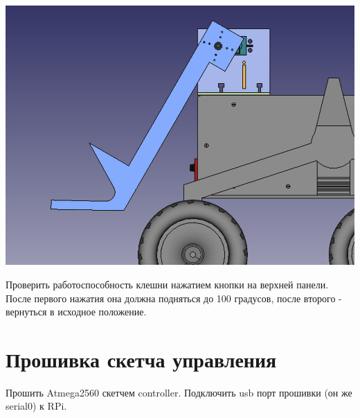 \documentclass[12pt,a4paper,oneside]{article}
\begin{document}
\includegraphics[width=\textwidth]{full_claw.png}

Проверить работоспособность клешни нажатием кнопки на верхней панели. После
первого нажатия она должна подняться до 100 градусов, после второго - вернуться
в исходное положение.

\section{Прошивка скетча управления}
Прошить Atmega2560 скетчем controller.
Подключить usb порт прошивки (он же serial0) к RPi.
\end{document}
